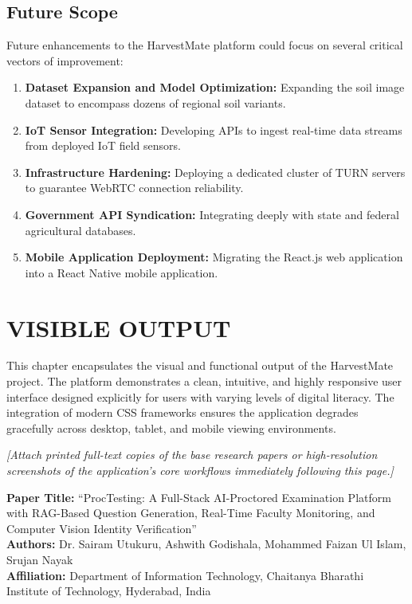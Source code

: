 \documentclass[12pt,a4paper]{report}
\begin{document}
\section{Future Scope}
Future enhancements to the HarvestMate platform could focus on several critical vectors of improvement:
\begin{enumerate}
    \item \textbf{Dataset Expansion and Model Optimization:} Expanding the soil image dataset to encompass dozens of regional soil variants.
    \item \textbf{IoT Sensor Integration:} Developing APIs to ingest real-time data streams from deployed IoT field sensors.
    \item \textbf{Infrastructure Hardening:} Deploying a dedicated cluster of TURN servers to guarantee WebRTC connection reliability.
    \item \textbf{Government API Syndication:} Integrating deeply with state and federal agricultural databases.
    \item \textbf{Mobile Application Deployment:} Migrating the React.js web application into a React Native mobile application.
\end{enumerate}

\chapter{VISIBLE OUTPUT}

This chapter encapsulates the visual and functional output of the HarvestMate project. The platform demonstrates a clean, intuitive, and highly responsive user interface designed explicitly for users with varying levels of digital literacy. The integration of modern CSS frameworks ensures the application degrades gracefully across desktop, tablet, and mobile viewing environments.

\textit{[Attach printed full-text copies of the base research papers or high-resolution screenshots of the application's core workflows immediately following this page.]}

\textbf{Paper Title:} ``ProcTesting: A Full-Stack AI-Proctored Examination Platform with RAG-Based Question Generation, Real-Time Faculty Monitoring, and Computer Vision Identity Verification''\\
\textbf{Authors:} Dr. Sairam Utukuru, Ashwith Godishala, Mohammed Faizan Ul Islam, Srujan Nayak\\
\textbf{Affiliation:} Department of Information Technology, Chaitanya Bharathi Institute of Technology, Hyderabad, India
\end{document}
